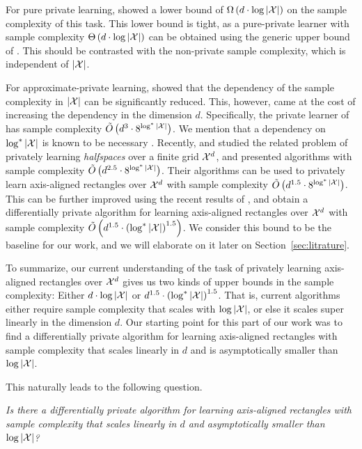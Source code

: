 \documentclass[12pt,a4paper,oneside,onecolumn]{book}
\begin{document}
For pure private learning, \citet{FeldmanX15} showed a lower bound of $\Omega\left(d\cdot\log|\mathcal{X}|\right)$ on the sample complexity of this task. 
This lower bound is tight, as a pure-private learner with sample complexity $\Theta\left(d\cdot\log|\mathcal{X}|\right)$ can be obtained using the generic upper bound of \citet{KLNRS08}.
This should be contrasted with the non-private sample complexity, which is independent of $|\mathcal{X}|$.

For approximate-private learning, \citet{BNS13b} showed that the dependency of the sample complexity in $|\mathcal{X}|$ can be significantly reduced. This, however, came at the cost of increasing the dependency in the dimension $d$. Specifically, the private learner of \citet{BNS13b} has sample complexity $\tilde{O}\left( d^3 \cdot 8^{\log^*|\mathcal{X}|} \right)$.
We mention that a dependency on $\log^*|\mathcal{X}|$ is known to be necessary \citep{BNSV15,AlonLMM19}. 
Recently, \citet{BeimelMNS19} and \citet{KaplanMST20} studied the related problem of privately learning {\em halfspaces} over a finite grid $\mathcal{X}^d$, and presented algorithms with sample complexity $\tilde{O}\left( d^{2.5} \cdot 8^{\log^*|\mathcal{X}|} \right)$. Their algorithms can be used to privately learn axis-aligned rectangles over $\mathcal{X}^d$ with sample complexity $\tilde{O}\left( d^{1.5} \cdot 8^{\log^*|\mathcal{X}|} \right)$. This can be further improved using the recent results of \citet{KaplanLMNS20}, and obtain a differentially private algorithm for learning axis-aligned rectangles over $\mathcal{X}^d$ with sample complexity $\tilde{O}\left( d^{1.5} \cdot \left( \log^*|\mathcal{X}|\right)^{1.5} \right)$. We consider this bound to be the baseline for our work, and we will elaborate on it later on Section~\ref{sec:litrature}.

To summarize, our current understanding of the task of privately learning axis-aligned rectangles over $\mathcal{X}^d$ gives us two kinds of upper bounds in the sample complexity: Either $d\cdot\log|\mathcal{X}|$ \;or\; $d^{1.5} \cdot \left( \log^*|\mathcal{X}|\right)^{1.5}$. That is, current algorithms either require sample complexity that scales with $\log|\mathcal{X}|$, or else it scales super linearly in the dimension $d$. Our starting point for this part of our work was to find a differentially private algorithm for learning axis-aligned rectangles with sample complexity that scales linearly in $d$ and is asymptotically smaller than $\log|\mathcal{X}|$.

This naturally leads to the following question.

\begin{question}
\label{qs:axis-aligned}
{\em Is there a differentially private algorithm for learning axis-aligned rectangles with sample complexity that scales linearly in $d$ and asymptotically smaller than $\log|\mathcal{X}|$?}
\end{question}
\end{document}
